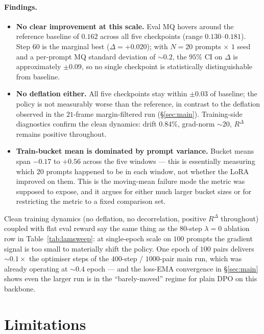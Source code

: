 \documentclass{article}
\begin{document}
\paragraph{Findings.}
\begin{itemize}
\item \textbf{No clear improvement at this scale.}  Eval MQ hovers around the reference baseline of $0.162$ across all five checkpoints (range $0.130$--$0.181$).  Step $60$ is the marginal best ($\Delta {=} +0.020$); with $N{=}20$ prompts $\times$ $1$ seed and a per-prompt MQ standard deviation of $\sim 0.2$, the $95\%$ CI on $\Delta$ is approximately $\pm 0.09$, so no single checkpoint is statistically distinguishable from baseline.
\item \textbf{No deflation either.}  All five checkpoints stay within $\pm 0.03$ of baseline; the policy is not measurably worse than the reference, in contrast to the deflation observed in the $21$-frame margin-filtered run (\S\ref{sec:main}).  Training-side diagnostics confirm the clean dynamics: drift $0.84\%$, grad-norm $\sim 20$, $R^{\Delta}$ remains positive throughout.
\item \textbf{Train-bucket mean is dominated by prompt variance.}  Bucket means span $-0.17$ to $+0.56$ across the five windows --- this is essentially measuring which $20$ prompts happened to be in each window, not whether the LoRA improved on them.  This is the moving-mean failure mode the metric was supposed to expose, and it argues for either much larger bucket sizes or for restricting the metric to a fixed comparison set.
\end{itemize}

Clean training dynamics (no deflation, no decorrelation, positive $R^{\Delta}$ throughout) coupled with flat eval reward say the same thing as the $80$-step $\lambda{=}0$ ablation row in Table~\ref{tab:lamsweep}: at single-epoch scale on $100$ prompts the gradient signal is too small to materially shift the policy.  One epoch of $100$ pairs delivers $\sim 0.1{\times}$ the optimiser steps of the $400$-step / $1000$-pair main run, which was already operating at $\sim 0.4$ epoch --- and the loss-EMA convergence in \S\ref{sec:main} shows even the larger run is in the ``barely-moved'' regime for plain DPO on this backbone.

\section{Limitations}
\label{sec:limitations}
\end{document}
